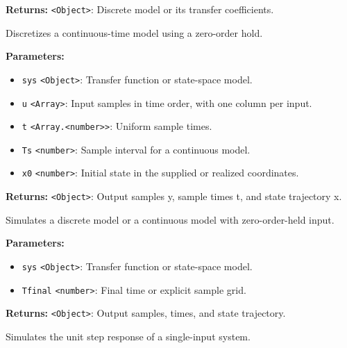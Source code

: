 \documentclass[12pt,a4paper]{article}
\begin{document}
\noindent \textbf{Returns:} \texttt{<Object>}: Discrete model or its transfer coefficients.

\noindent Discretizes a continuous-time model using a zero-order hold.

\vspace{5mm}
\noindent {}


\noindent \textbf{Parameters:}
\begin{itemize}
  \item \texttt{sys} \texttt{<Object>}: Transfer function or state-space model.
  \item \texttt{u} \texttt{<Array>}: Input samples in time order, with one column per input.
  \item \texttt{t} \texttt{<Array.<number>>}: Uniform sample times.
  \item \texttt{Ts} \texttt{<number>}: Sample interval for a continuous model.
  \item \texttt{x0} \texttt{<number>}: Initial state in the supplied or realized coordinates.
\end{itemize}

\noindent \textbf{Returns:} \texttt{<Object>}: Output samples y, sample times t, and state trajectory x.

\noindent Simulates a discrete model or a continuous model with zero-order-held input.

\vspace{5mm}
\noindent {}


\noindent \textbf{Parameters:}
\begin{itemize}
  \item \texttt{sys} \texttt{<Object>}: Transfer function or state-space model.
  \item \texttt{Tfinal} \texttt{<number>}: Final time or explicit sample grid.
\end{itemize}

\noindent \textbf{Returns:} \texttt{<Object>}: Output samples, times, and state trajectory.

\noindent Simulates the unit step response of a single-input system.

\vspace{5mm}
\noindent {}
\end{document}
